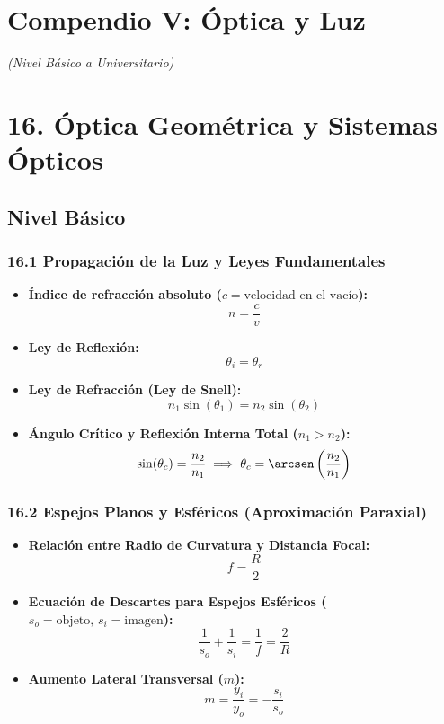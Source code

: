 \documentclass[11pt,a4paper]{article}
\begin{document}
\section*{Compendio V: Óptica y Luz}

\textit{(Nivel Básico a Universitario)}

\section*{16. Óptica Geométrica y Sistemas Ópticos}

\subsection*{Nivel Básico}

\subsubsection*{16.1 Propagación de la Luz y Leyes Fundamentales}

\begin{itemize}
  \item \textbf{Índice de refracción absoluto ($c = \text{velocidad en el vacío}$):}
  \[
    n = \frac{c}{v}
  \]
  \item \textbf{Ley de Reflexión:}
  \[
    \theta_i = \theta_r
  \]
  \item \textbf{Ley de Refracción (Ley de Snell):}
  \[
    n_1 \sin(\theta_1) = n_2 \sin(\theta_2)
  \]
  \item \textbf{Ángulo Crítico y Reflexión Interna Total ($n_1 > n_2$):}
  \[
    \sin(\theta_c) = \frac{n_2}{n_1} \implies \theta_c = \arcsen\left( \frac{n_2}{n_1} \right)
  \]
\end{itemize}

\subsubsection*{16.2 Espejos Planos y Esféricos (Aproximación Paraxial)}

\begin{itemize}
  \item \textbf{Relación entre Radio de Curvatura y Distancia Focal:}
  \[
    f = \frac{R}{2}
  \]
  \item \textbf{Ecuación de Descartes para Espejos Esféricos ($s_o = \text{objeto}, \, s_i = \text{imagen}$):}
  \[
    \frac{1}{s_o} + \frac{1}{s_i} = \frac{1}{f} = \frac{2}{R}
  \]
  \item \textbf{Aumento Lateral Transversal ($m$):}
  \[
    m = \frac{y_i}{y_o} = -\frac{s_i}{s_o}
  \]
\end{itemize}
\end{document}
